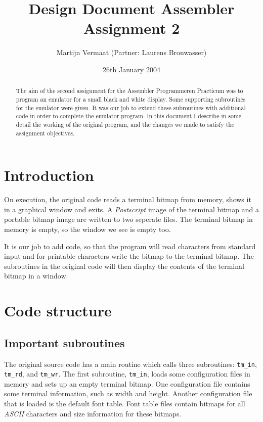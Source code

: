 \documentclass[11pt]{article}
\title{Design Document Assembler Assignment 2}
\author{
	Martijn Vermaat (Partner: Laurens Bronwasser)
}
\date{26th January 2004}
\begin{document}
\maketitle

\begin{abstract}
The aim of the second assignment for the Assembler Programmeren Practicum was to program an emulator for a small black and white display. Some supporting subroutines for the emulator were given. It was our job to extend these subroutines with additional code in order to complete the emulator program. In this document I describe in some detail the working of the original program, and the changes we made to satisfy the assignment objectives.
\end{abstract}

\tableofcontents

\newpage


\section{Introduction}

On execution, the original code reads a terminal bitmap from memory, shows it in a graphical window and exits. A \emph{Postscript} image of the terminal bitmap and a portable bitmap image are written to two seperate files. The terminal bitmap in memory is empty, so the window we see is empty too.

It is our job to add code, so that the program will read characters from standard input and for printable characters write the bitmap to the terminal bitmap. The subroutines in the original code will then display the contents of the terminal bitmap in a window.


\section{Code structure}

\subsection{Important subroutines}

The original source code has a main routine which calls three subroutines: \verb|tm_in|, \verb|tm_rd|, and \verb|tm_wr|. The first subroutine, \verb|tm_in|, loads some configuration files in memory and sets up an empty terminal bitmap. One configuration file contains some terminal information, such as width and height. Another configuration file that is loaded is the default font table. Font table files contain bitmaps for all \emph{ASCII} characters and size information for these bitmaps.
\end{document}
